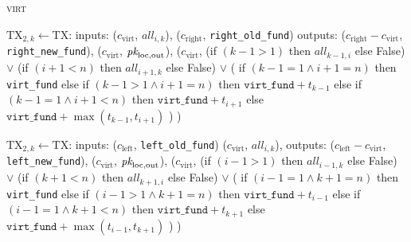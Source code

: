 \begin{center}
\begin{processbox}{\textsc{virt}}
\begin{algorithmic}[1]
         
          \State $\mathrm{TX}_{2, k} \gets \mathrm{TX}$:
          \Indent
            \State inputs:
            \Indent
              \State ($c_{\mathrm{virt}}$, $\mathit{all}_{i, k}$),
              \label{code:virtual-layer:mid-txs:extend-interval-left:virt}
              \State ($c_{\mathrm{right}}$, \texttt{right\_old\_fund})
            \EndIndent
            \State outputs:
            \Indent
              \State ($c_{\mathrm{right}} - c_{\mathrm{virt}}$,
              \texttt{right\_new\_fund}),
              \State ($c_{\mathrm{virt}}$, $\textit{pk}_{\mathrm{loc}, \mathrm{out}}$),
              \State ($c_{\mathrm{virt}}$,
              \Indent
                \State (if $(k-1 > 1)$ then $\mathit{all}_{k-1, i}$ else False)
                \State $\vee$ (if $(i+1 < n)$ then $\mathit{all}_{i+1, k}$ else
                False)
                \State $\vee$ (
                \Indent
                  \State if $(k-1 = 1 \wedge i+1 = n)$ then \texttt{virt\_fund}
                  \State else if $(k-1 > 1 \wedge i+1 = n)$ then
                  $\texttt{virt\_fund} + t_{k-1}$
                  \State else if $(k-1 = 1 \wedge i+1 < n)$ then
                  $\texttt{virt\_fund} + t_{i+1}$
                  \State else 
                  $\texttt{virt\_fund} + \max{(t_{k-1}, t_{i+1})}$
                \EndIndent
                \State )
              \EndIndent
              \State )
            \EndIndent
          \EndIndent
        \EndFor

         
          \State $\mathrm{TX}_{2, k} \gets \mathrm{TX}$:
          \Indent
            \State inputs:
            \Indent
              \State ($c_{\mathrm{left}}$, \texttt{left\_old\_fund})
              \State ($c_{\mathrm{virt}}$, $\mathit{all}_{i, k}$),
            \EndIndent
            \State outputs:
            \Indent
              \State ($c_{\mathrm{left}} - c_{\mathrm{virt}}$,
              \texttt{left\_new\_fund}),
              \label{code:virtual-layer:mid-txs:extend-interval-right:new-fund}
              \State ($c_{\mathrm{virt}}$, $\textit{pk}_{\mathrm{loc}, \mathrm{out}}$),
              \State ($c_{\mathrm{virt}}$,
              \Indent
                \State (if $(i-1 > 1)$ then $\mathit{all}_{i-1, k}$ else False)
                \State $\vee$ (if $(k+1 < n)$ then $\mathit{all}_{k+1, i}$ else
                False)
                \State $\vee$ (
                \Indent
                  \State if $(i-1 = 1 \wedge k+1 = n)$ then \texttt{virt\_fund}
                  \State else if $(i-1 > 1 \wedge k+1 = n)$ then
                  $\texttt{virt\_fund} + t_{i-1}$
                  \State else if $(i-1 = 1 \wedge k+1 < n)$ then
                  $\texttt{virt\_fund} + t_{k+1}$
                  \State else 
                  $\texttt{virt\_fund} + \max{(t_{i-1}, t_{k+1})}$
                \EndIndent
                \State )
              \EndIndent
              \State )
            \EndIndent
          \EndIndent
        \EndFor


\end{algorithmic}
\end{processbox}
\end{center}
